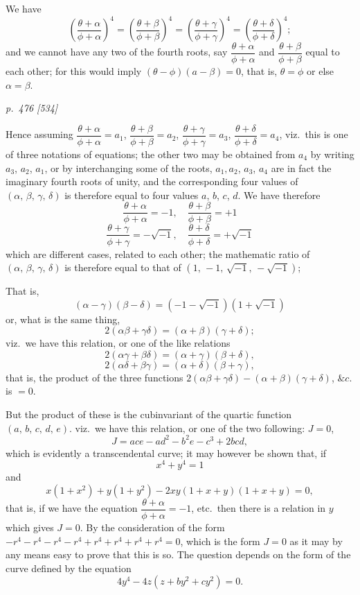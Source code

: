 \documentclass[11pt,a4paper]{book}
\begin{document}
We have
\[
\left(\frac{\theta+\alpha}{\phi+\alpha}\right)^4 = \left(\frac{\theta+\beta}{\phi+\beta}\right)^4 = \left(\frac{\theta+\gamma}{\phi+\gamma}\right)^4 = \left(\frac{\theta+\delta}{\phi+\delta}\right)^4;
\]
and we cannot have any two of the fourth roots, say $\dfrac{\theta+\alpha}{\phi+\alpha}$ and $\dfrac{\theta+\beta}{\phi+\beta}$ equal to each
other; for this would imply $(\theta-\phi)(a-\beta) = 0$, that is, $\theta = \phi$ or else $\alpha = \beta$.

\clearpage

\bigskip
\textit{p.~476 [534]}
\smallskip

\noindent
Hence assuming $\dfrac{\theta+\alpha}{\phi+\alpha} = a_1$, $\dfrac{\theta+\beta}{\phi+\beta} = a_2$, $\dfrac{\theta+\gamma}{\phi+\gamma} = a_3$, $\dfrac{\theta+\delta}{\phi+\delta} = a_4$,
viz.\ this is one of three notations of equations; the other two may be obtained from
$a_4$ by writing $a_3$, $a_2$, $a_1$, or by interchanging some of the roots, $a_1, a_2$, $a_3$, $a_4$ are
in fact the imaginary fourth roots of unity, and the corresponding four values of $(\alpha,\,\beta,\,\gamma,\,\delta)$
is therefore equal to four values $a$, $b$, $c$, $d$.  We have therefore
\[
\frac{\theta+\alpha}{\phi+\alpha} = -1, \quad \frac{\theta+\beta}{\phi+\beta} = +1
\]
\[
\frac{\theta+\gamma}{\phi+\gamma} = -\sqrt{-1}, \quad \frac{\theta+\delta}{\phi+\delta} = +\sqrt{-1}
\]
which are different cases, related to each other; the mathematic ratio of $(\alpha,\,\beta,\,\gamma,\,\delta)$
is therefore equal to that of $(1,\,-1,\,\sqrt{-1},\,-\sqrt{-1})$;

That is,
\[
(\alpha-\gamma)(\beta-\delta) = (-1-\sqrt{-1})(1+\sqrt{-1})
\]
or, what is the same thing,
\[
2(\alpha\beta+\gamma\delta) = (\alpha+\beta)(\gamma+\delta);
\]
viz.\ we have this relation, or one of the like relations
\[
2(\alpha\gamma+\beta\delta) = (\alpha+\gamma)(\beta+\delta),
\]
\[
2(\alpha\delta+\beta\gamma) = (\alpha+\delta)(\beta+\gamma),
\]
that is, the product of the three functions $2(\alpha\beta+\gamma\delta) - (\alpha+\beta)(\gamma+\delta)$, $\&c.$\, is $=0$.

But the product of these is the cubinvariant of the quartic function $(a,\,b,\,c,\,d,\,e)$.
viz.\ we have this relation, or one of the two following: $J=0$,
\[
J = ace -ad^2 - b^2e - c^3 + 2bcd,
\]
which is evidently a transcendental curve; it may however be shown that, if
\[
x^4 + y^4 = 1
\]
and
\[
x(1+x^2) + y(1+y^2) - 2xy(1+x+y)(1+x+y) = 0,
\]
that is, if we have the equation $\dfrac{\theta+\alpha}{\phi+\alpha} = -1$, etc.\ then there is a relation in
$y$ which gives $J = 0$. By the consideration of the form $-r^4 - r^4 - r^4 - r^4 + r^4 + r^4 + r^4 + r^4 = 0$,
which is the form $J=0$ as it may by any means easy to prove that this is so. The
question depends on the form of the curve defined by the equation
\[
4y^4 -4z(z+by^2 + cy^2) = 0.
\]
\end{document}
